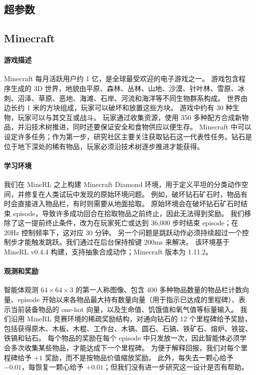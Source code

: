 \clearpage
\subsection*{超参数}


\clearpage
\subsection*{Minecraft}
\label{sec:mcenv}

\paragraph{游戏描述}
Minecraft 每月活跃用户约 1 亿，是全球最受欢迎的电子游戏之一。
游戏包含程序生成的 3D 世界，地貌由平原、森林、丛林、山地、沙漠、针叶林、雪原、冰刺、沼泽、草原、恶地、海滩、石岸、河流和海洋等不同生物群系构成。
世界由边长约 1 米的方块组成，玩家可以破坏和放置这些方块。
游戏中约有 30 种生物，玩家可以与其交互或战斗。
玩家通过收集资源，使用 350 多种配方合成新物品，并沿技术树推进，同时还要保证安全和食物供应以便生存。
Minecraft 中可以设定许多任务；作为第一步，研究社区主要关注获取钻石这一代表性任务。钻石是位于地下深处的稀有物品，玩家必须沿技术树逐步推进才能获得。

\paragraph{学习环境}
我们在 MineRL 之上构建 Minecraft Diamond 环境，用于定义平坦的分类动作空间，并修复在人类试玩中发现的原始环境问题。
例如，破坏钻石矿石时，物品有时会直接进入物品栏，有时则需要从地面拾取。
原始环境会在破坏钻石矿石时结束 episode，导致许多成功回合在拾取物品之前终止，因此无法得到奖励。
我们移除了这一提前终止条件，改为在玩家死亡或达到 36,000 步时结束 episode；在 20Hz 控制频率下，这对应 30 分钟。
另一个问题是跳跃动作必须持续超过一个控制步才能触发跳跃。我们通过在后台保持按键 200ms 来解决。
该环境基于 MineRL v0.4.4\citep{guss2019minerl} 构建，支持抽象合成动作；Minecraft 版本为 1.11.2。

\paragraph{观测和奖励}
智能体观测 $64\times64\times3$ 的第一人称图像、包含 400 多种物品数量的物品栏计数向量、episode 开始以来各物品最大持有数量向量（用于指示已达成的里程碑）、表示当前装备物品的 one-hot 向量，以及生命值、饥饿值和氧气值等标量输入。
我们沿用 MineRL 竞赛环境的稀疏奖励结构\citep{guss2019minerl}，对通向钻石的 12 个里程碑给予奖励，包括获得原木、木板、木棍、工作台、木镐、圆石、石镐、铁矿石、熔炉、铁锭、铁镐和钻石。
每个物品的奖励在每个 episode 中只发放一次，因此智能体必须学会多次收集某些物品，才能达成下一个里程碑。
为便于解释回报，我们对每个里程碑给予 $+1$ 奖励，而不是按物品价值缩放奖励。
此外，每失去一颗心给予 $-0.01$，每恢复一颗心给予 $+0.01$；但我们没有进一步研究这一设计是否有帮助。
